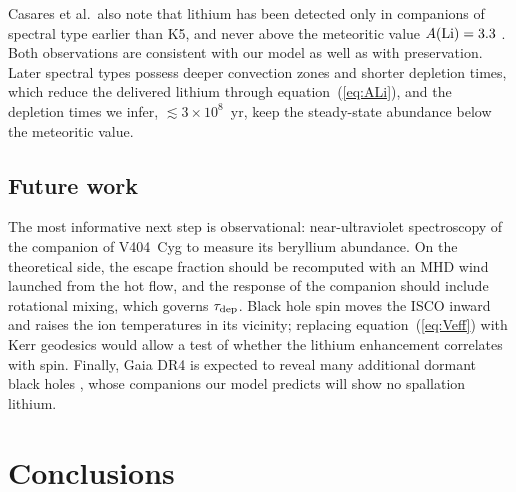 \documentclass[twocolumn,showpacs,preprintnumbers,amsmath,amssymb]{revtex4}
\begin{document}
Casares et al.\ also note that lithium has been detected only in companions of spectral type earlier than K5, and never above the meteoritic value $A({\rm Li})=3.3$ \cite{Casares2007}. Both observations are consistent with our model as well as with preservation. Later spectral types possess deeper convection zones and shorter depletion times, which reduce the delivered lithium through equation~(\ref{eq:ALi}), and the depletion times we infer, $\lesssim3\times10^{8}$~yr, keep the steady-state abundance below the meteoritic value.

\subsection{Future work}

The most informative next step is observational: near-ultraviolet spectroscopy of the companion of V404~Cyg to measure its beryllium abundance. On the theoretical side, the escape fraction should be recomputed with an MHD wind launched from the hot flow, and the response of the companion should include rotational mixing, which governs $\tau_{\rm dep}$. Black hole spin moves the ISCO inward and raises the ion temperatures in its vicinity; replacing equation~(\ref{eq:Veff}) with Kerr geodesics would allow a test of whether the lithium enhancement correlates with spin. Finally, Gaia DR4 is expected to reveal many additional dormant black holes \cite{ElBadry_2023}, whose companions our model predicts will show no spallation lithium.


\section{\label{sec:conclusions} Conclusions}
\end{document}
